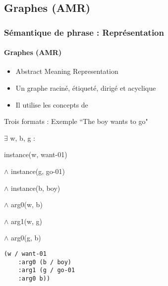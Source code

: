 \documentclass[xcolor=table]{beamer}
\begin{document}
\subsection{Graphes (AMR)}

\begin{frame}[fragile]
	\frametitle{Sémantique de phrase : Représentation}
	\framesubtitle{Graphes (AMR)}
	
	\begin{itemize}
		\item Abstract Meaning Representation \cite{2013-banarescu-al}
		\item Un graphe raciné, étiqueté, dirigé et acyclique
		\item Il utilise les concepts de 
	\end{itemize}

	\begin{exampleblock}{Trois formats : Exemple ``The boy wants to go"}
		\begin{minipage}{.3\textwidth}
			
			\footnotesize
			$ \exists $ w, b, g : 
			
			instance(w, want-01) 
			
			$ \wedge $ instance(g, go-01) 
			
			$ \wedge $ instance(b, boy) 
			
			$ \wedge $ arg0(w, b) 
			
			$ \wedge $ arg1(w, g) 
			
			$ \wedge $ arg0(g, b)
		\end{minipage}
		\begin{minipage}{.35\textwidth}
			
			\begin{verbatim}
(w / want-01
    :arg0 (b / boy)
    :arg1 (g / go-01
    :arg0 b))
			\end{verbatim}
			
		\end{minipage}
		\begin{minipage}{.3\textwidth}
			
		\end{minipage}
	\end{exampleblock}
	
\end{frame}
\end{document}

